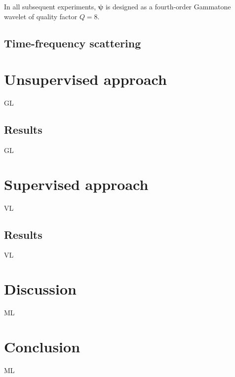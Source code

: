 \documentclass[journal]{IEEEtran}
\begin{document}
In all subsequent experiments,
$\boldsymbol{\psi}$ is designed as a fourth-order Gammatone
wavelet of quality factor $Q = 8$.

\subsection{Time-frequency scattering}

\section{Unsupervised approach}

GL

\subsection{Results}

GL

\section{Supervised approach}

VL


\subsection{Results}

VL

\section{Discussion}

ML

\section{Conclusion}

ML




% 
\end{document}
